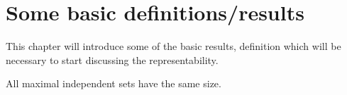 \section{Some basic definitions/results}

This chapter will introduce some of the basic results, definition which will be necessary to start discussing the representability.

\begin{thm}
All maximal independent sets have the same size.
\end{thm}

